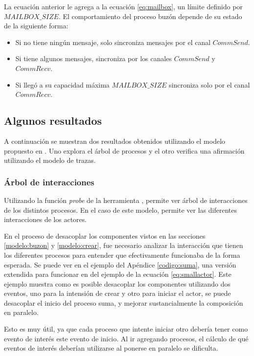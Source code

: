 La ecuación anterior le agrega a la ecuación \eqref{eq:mailbox}, un límite definido por $MAILBOX\_SIZE$. El comportamiento del proceso buzón depende de su estado de la siguiente forma:

\begin{itemize}
\item Si no tiene ningún mensaje, solo sincroniza mensajes por el canal $CommSend$.
\item Si tiene algunos mensajes, sincroniza por los canales $CommSend$ y $CommRecv$.
\item Si llegó a su capacidad máxima $MAILBOX\_SIZE$ sincroniza solo por el canal $CommRecv$.
\end{itemize}

\subsection{Algunos resultados}

A continuación se muestran dos resultados obtenidos utilizando el modelo propuesto en \CSPm. Uno explora el árbol de procesos y el otro verifica una afirmación utilizando el modelo de trazas.

\subsubsection*{Árbol de interacciones}

Utilizando la función \textit{probe} de la herramienta \FDR, permite ver árbol de interacciones de los distintos procesos. En el caso de este modelo, permite ver las diferentes interacciones de los actores.

En el proceso de desacoplar los componentes vistos en las secciones \ref{modelo:buzon} y \ref{modelo:crear}, fue necesario analizar la interacción que tienen los diferentes procesos para entender que efectivamente funcionaba de la forma esperada. Se puede ver en el ejemplo del Apéndice \ref{codigo:suma}, una versión extendida para funcionar en \FDR del ejemplo de la ecuación \ref{eq:smallactor}. Este ejemplo muestra como es posible desacoplar los componentes utilizando dos eventos, uno para la intensión de crear y otro para iniciar el actor, se puede desacoplar el inicio del proceso suma, y mejorar sustancialmente la composición en paralelo. 

Esto es muy útil, ya que cada proceso que intente iniciar otro debería tener como evento de interés este evento de inicio. Al ir agregando procesos, el cálculo de qué eventos de interés deberían utilizarse al ponerse en paralelo se dificulta. 

